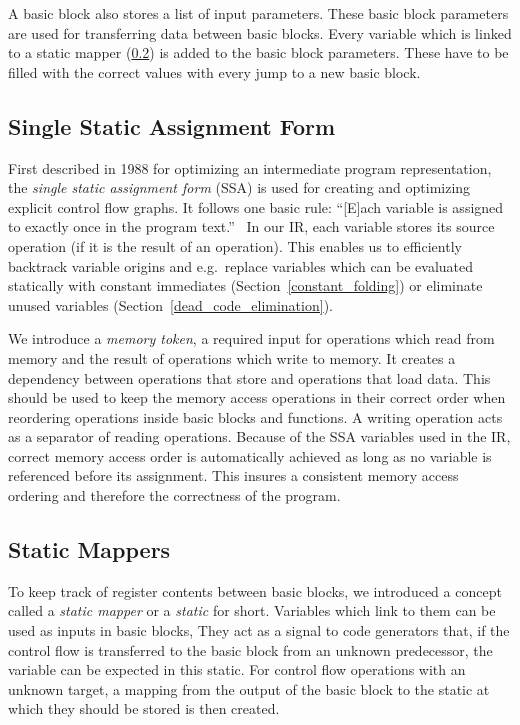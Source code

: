 \documentclass[course=eragp]{aspdoc}
\begin{document}
\par

A basic block also stores a list of input parameters. These basic block parameters are used for
transferring data between basic blocks. Every variable which is linked to a static mapper (\ref{statics}) is
added to the basic block parameters. These have to be filled with the correct values with every jump to
a new basic block.


\subsection{Single Static Assignment Form}\label{ssa}

First described in 1988 for optimizing an intermediate program representation\cite{ssa_proposal},
the \emph{single static assignment form} (SSA) is used for creating and optimizing explicit control
flow graphs. It follows one basic rule: ``[E]ach variable is
assigned to exactly once in the program text.''~\cite{ssa_proposal} In our IR, each variable
stores its source operation (if it is the result of an operation). This enables us to efficiently
backtrack variable origins and e.g.\ replace variables which can be evaluated statically with constant
immediates (Section~\ref{constant_folding}) or eliminate unused variables (Section~\ref{dead_code_elimination}).

We introduce a \emph{memory token}, a required input for operations which read from memory and the
result of operations which write to memory. It creates a dependency between operations that store
and operations that load data. This should be used to keep the memory access operations
in their correct order when reordering operations inside basic blocks and functions. A writing
operation acts as a separator of reading operations. Because of the SSA variables used in the IR,
correct memory access order is automatically achieved as long as no variable is referenced before
its assignment. This insures a consistent memory access ordering and therefore the correctness of the
program.

\subsection{Static Mappers}\label{statics}

To keep track of register contents between basic blocks, we introduced a concept called a
\textit{static mapper} or a \textit{static} for short.
Variables which link to them can be used as inputs in basic blocks, They act as a signal to code
generators that, if the control flow is transferred to the basic block from an unknown predecessor,
the variable can be expected in this static.
For control flow operations with an unknown target, a mapping from the output of the basic
block to the static at which they should be stored is then created.
\end{document}
